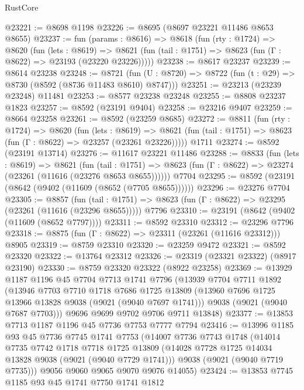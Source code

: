\begin{lexlean}{RustCore}
\begin{coremodule}
@23221 := @8698 @1198
@23226 := @8695 (@8697 @23221 @11486 @8653 @8655)
@23237 := fun (params : @8616) =>
  @8618
    (fun (rty : @1724) =>
    @8620
      (fun (lets : @8619) =>
      @8621 (fun (tail : @1751) => @8623 (fun (Γ : @8622) => @23193 (@23220 @23226)))))
@23238 := @8617 @23237
@23239 := @8614 @23238
@23248 := @8721
    (fun (U : @8720) => @8722 (fun (t : @29) => @8730 (@8592 (@8736 @11483 @8610) @8747)))
@23251 := @23213 (@23239 @23248) @11481
@23253 := @8577 @23238 @23248
@23255 := @8808 @23237 @1823
@23257 := @8592 (@23191 @9404)
@23258 := @23216 @9407
@23259 := @8664 @23258
@23261 := @8592 (@23259 @8685)
@23272 := @8811
    (fun (rty : @1724) =>
    @8620
      (fun (lets : @8619) =>
      @8621 (fun (tail : @1751) => @8623 (fun (Γ : @8622) => @23257 (@23261 @23226)))))
    @1711
@23274 := @8592 (@23191 @13714)
@23276 := @11617 @23221 @11486
@23288 := @8833
    (fun (lets : @8619) =>
    @8621
      (fun (tail : @1751) =>
      @8623 (fun (Γ : @8622) => @23274 (@23261 (@11616 (@23276 @8653 @8655))))))
    @7704
@23295 := @8592 (@23191 (@8642 (@9402 (@11609 (@8652 (@7705 @8655))))))
@23296 := @23276 @7704
@23305 := @8857
    (fun (tail : @1751) => @8623 (fun (Γ : @8622) => @23295 (@23261 (@11616 (@23296 @8655)))))
    @7796
@23310 := @23191 (@8642 (@9402 (@11609 (@8652 @7797))))
@23311 := @8592 @23310
@23312 := @23296 @7796
@23318 := @8875 (fun (Γ : @8622) => @23311 (@23261 (@11616 @23312))) @8905
@23319 := @8759 @23310
@23320 := @23259 @9472
@23321 := @8592 @23320
@23322 := @13764 @23312
@23326 := @23319 (@23321 @23322) (@8917 @23190)
@23330 := @8759 @23320 @23322 (@8922 @23258)
@23369 := @13929
    @1187
    @1196
    @45
    @7704
    @7713
    @1741
    @7796
    (@13939
      @7704
      @7711
      @1892
      (@13946
        @7703
        @7710
        @1718
        @7686
        @1725
        @13809
        (@13960 @7696 @1725 @13966 @13828 @9038 (@9021 (@9040 @7697 @1741)))
        @9038
        (@9021 (@9040 @7687 @7703)))
      @9696
      @9699
      @9702
      @9706
      @9711
      @13848)
@23377 := @13853 @7713 @1187 @1196 @45 @7736 @7753 @7777 @7794
@23416 := @13996
    @1185
    @93
    @45
    @7736
    @7745
    @1741
    @7753
    (@14007
      @7736
      @7743
      @1748
      (@14014
        @7735
        @7742
        @1718
        @7718
        @1725
        @13809
        (@14028 @7728 @1725 @14034 @13828 @9038 (@9021 (@9040 @7729 @1741)))
        @9038
        (@9021 (@9040 @7719 @7735)))
      @9056
      @9060
      @9065
      @9070
      @9076
      @14055)
@23424 := @13853 @7745 @1185 @93 @45 @1741 @7750 @1741 @1812

\end{coremodule}
\end{lexlean}
